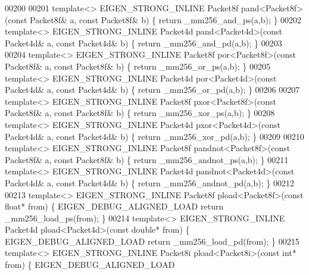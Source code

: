 \begin{DoxyCode}
{{00200 
00201 \textcolor{keyword}{template}<> EIGEN\_STRONG\_INLINE Packet8f pand<Packet8f>(\textcolor{keyword}{const} Packet8f& a, \textcolor{keyword}{const} Packet8f& b) \{ \textcolor{keywordflow}{return} 
      \_mm256\_and\_ps(a,b); \}
00202 \textcolor{keyword}{template}<> EIGEN\_STRONG\_INLINE Packet4d pand<Packet4d>(\textcolor{keyword}{const} Packet4d& a, \textcolor{keyword}{const} Packet4d& b) \{ \textcolor{keywordflow}{return} 
      \_mm256\_and\_pd(a,b); \}
00203 
00204 \textcolor{keyword}{template}<> EIGEN\_STRONG\_INLINE Packet8f por<Packet8f>(\textcolor{keyword}{const} Packet8f& a, \textcolor{keyword}{const} Packet8f& b) \{ \textcolor{keywordflow}{return} 
      \_mm256\_or\_ps(a,b); \}
00205 \textcolor{keyword}{template}<> EIGEN\_STRONG\_INLINE Packet4d por<Packet4d>(\textcolor{keyword}{const} Packet4d& a, \textcolor{keyword}{const} Packet4d& b) \{ \textcolor{keywordflow}{return} 
      \_mm256\_or\_pd(a,b); \}
00206 
00207 \textcolor{keyword}{template}<> EIGEN\_STRONG\_INLINE Packet8f pxor<Packet8f>(\textcolor{keyword}{const} Packet8f& a, \textcolor{keyword}{const} Packet8f& b) \{ \textcolor{keywordflow}{return} 
      \_mm256\_xor\_ps(a,b); \}
00208 \textcolor{keyword}{template}<> EIGEN\_STRONG\_INLINE Packet4d pxor<Packet4d>(\textcolor{keyword}{const} Packet4d& a, \textcolor{keyword}{const} Packet4d& b) \{ \textcolor{keywordflow}{return} 
      \_mm256\_xor\_pd(a,b); \}
00209 
00210 \textcolor{keyword}{template}<> EIGEN\_STRONG\_INLINE Packet8f pandnot<Packet8f>(\textcolor{keyword}{const} Packet8f& a, \textcolor{keyword}{const} Packet8f& b) \{ \textcolor{keywordflow}{return} 
      \_mm256\_andnot\_ps(a,b); \}
00211 \textcolor{keyword}{template}<> EIGEN\_STRONG\_INLINE Packet4d pandnot<Packet4d>(\textcolor{keyword}{const} Packet4d& a, \textcolor{keyword}{const} Packet4d& b) \{ \textcolor{keywordflow}{return} 
      \_mm256\_andnot\_pd(a,b); \}
00212 
00213 \textcolor{keyword}{template}<> EIGEN\_STRONG\_INLINE Packet8f pload<Packet8f>(\textcolor{keyword}{const} \textcolor{keywordtype}{float}*   from) \{ EIGEN\_DEBUG\_ALIGNED\_LOAD \textcolor{keywordflow}{
      return} \_mm256\_load\_ps(from); \}
00214 \textcolor{keyword}{template}<> EIGEN\_STRONG\_INLINE Packet4d pload<Packet4d>(\textcolor{keyword}{const} \textcolor{keywordtype}{double}*  from) \{ EIGEN\_DEBUG\_ALIGNED\_LOAD \textcolor{keywordflow}{
      return} \_mm256\_load\_pd(from); \}
00215 \textcolor{keyword}{template}<> EIGEN\_STRONG\_INLINE Packet8i pload<Packet8i>(\textcolor{keyword}{const} \textcolor{keywordtype}{int}*     from) \{ EIGEN\_DEBUG\_ALIGNED\_LOAD \textcolor{keywordflow}{
}}}
\end{DoxyCode}

